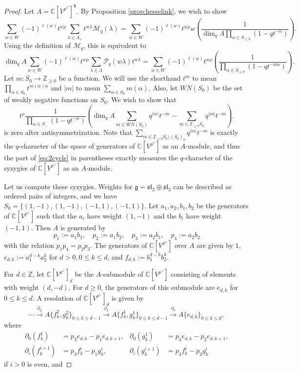 \documentclass[10pt,a4paper]{amsart}
\newcommand{\C}{\mathbb{C}}
\newcommand{\M}{\mathcal{M}}
\newcommand{\Z}{\mathbb{Z}}
\newcommand{\g}{\mathfrak{g}}
\newcommand{\h}{\mathfrak{h}}
\newcommand{\xto}[1]{\xrightarrow{#1}}
\renewcommand{\P}{\mathcal{P}}
\renewcommand{\sl}{\mathfrak{sl}}
\begin{document}
\begin{proof}
    Let $A=\C[V^{\rho^\vee}]^\h$. By Proposition \ref{prop:hesselink}, we wish to show
    \[\sum_{w\in W}(-1)^{\ell(w)}t^{w\rho}\sum_{\lambda\in\Lambda_+}t^{w\lambda}\M_q(\lambda)=\sum_{w\in W}(-1)^{\ell(w)}t^{w\rho}w\left(\frac{1}{\dim_qA\prod_{\alpha\in S_{\leq 0}}(1-qt^{-\alpha})}\right).\]
    Using the definition of $\M_q$, this is equivalent to
    \[\dim_qA\sum_{w\in W}(-1)^{\ell(w)}t^{w\rho}\sum_{\lambda\in\Lambda}\P_q(w\lambda)t^{w\lambda}=\sum_{w\in W}(-1)^{\ell(w)}t^{w\rho}\left(\frac{1}{\prod_{\alpha\in S_{\leq 0}}(1-qt^{-w\alpha})}\right).\]
    Let $m:S_0\to\Z_{\geq 0}$ be a function. We will use the shorthand $t^m$ to mean $\prod_{\alpha\in S_0}t^{m(\alpha)\alpha}$ and $|m|$ to mean $\sum_{\alpha\in S_0}m(\alpha)$. Also, let $WN(S_0)$ be the set of weakly negative functions on $S_0$. We wish to show that
    \begin{equation}\label{eq:2cycle}
        t^\rho\frac{1}{\prod_{\alpha\in S_-}(1-qt^{-\alpha})}\left(\dim_qA\sum_{m\in WN(S_0)}q^{|m|}t^{-m}-\sum_{m\in\Z_{\geq 0}S_0}q^{|m|}t^{-m}\right).
    \end{equation}
    is zero after antisymmetrization. Note that $\sum_{m\in\Z_{\geq 0}S_0\setminus(S_0)_0}q^{|m|}t^{-m}$ is exactly the $q$-character of the space of generators of $\C[V^{\rho^\vee}]$ as an $A$-module, and thus the part of \eqref{eq:2cycle} in parentheses exactly measures the $q$-character of the syzygies of $\C[V^{\rho^\vee}]$ as an $A$-module.

    Let us compute these syzygies. Weights for $\g=\sl_2\oplus\sl_2$ can be described as ordered pairs of integers, and we have $S_0=\{(1,-1),(1,-1),(-1,1),(-1,1)\}$. Let $a_1,a_2,b_1,b_2$ be the generators of $\C[V^{\rho^\vee}]$ such that the $a_i$ have weight $(1,-1)$ and the $b_i$ have weight $(-1,1)$. Then $A$ is generated by
    \[p_1:=a_1b_1,\quad p_2:=a_1b_2,\quad p_3:=a_2b_1,\quad p_4:=a_2b_2\]
    with the relation $p_1p_4=p_2p_3$. The generators of $\C[V^{\rho^\vee}]$ over $A$ are given by $1$, $e_{d,k}:=a_1^{d-k}a_2^k$ for $d>0,0\leq k\leq d$, and $f_{d,k}:=b_1^{d-k}b_2^k$. 

    For $d\in\Z$, let $\C[V^{\rho^\vee}]_d$ be the $A$-submodule of $\C[V^{\rho^\vee}]$ consisting of elements with weight $(d,-d)$. For $d\geq 0$, the generators of this submodule are $e_{d,k}$ for $0\leq k\leq d$. A resolution of $\C[V^{\rho^\vee}]_d$ is given by
    \[\cdots\xto{\partial_2}A\{f^2_k,g^2_k\}_{0\leq k\leq d-1}\xto{\partial_1}A\{f^1_k,g^1_k\}_{0\leq k\leq d-1}\xto{\partial_0}A\{e_{d,k}\}_{0\leq k\leq d},\]
    where
    \begin{align*}
        \partial_0(f_k^1)&=p_3e_{d,k}-p_1e_{d,k+1},&\partial_0(g_k^1)&=p_4e_{d,k}-p_2e_{d,k+1},\\
        \partial_i(f_k^{i+1})&=p_3f_k^i-p_1g_k^i,&\partial_i(g_k^{i+1})&=p_4f_k^i-p_2g_k^i
    \end{align*}
    if $i>0$ is even, and
    

\end{proof}
\end{document}
